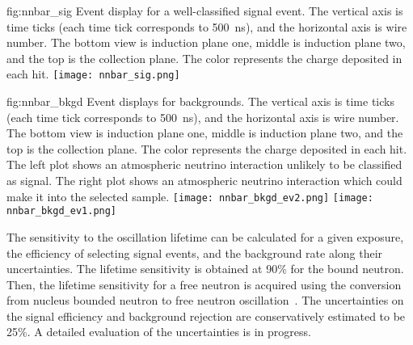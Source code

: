 \begin{dunefigure}
{fig:nnbar_sig}
{Event display for a well-classified \nnbar signal event.  The vertical axis is time ticks (each time tick corresponds to \SI{500}{\ns}), and the horizontal axis is wire number.  The bottom view is induction plane one, middle is induction plane two, and the top is the collection plane.  The color represents the charge deposited in each hit.}
\texttt{[image: nnbar\_sig.png]}
\end{dunefigure} 

\begin{dunefigure}
{fig:nnbar_bkgd}
{Event displays for \nnbar backgrounds.  The vertical axis is time ticks (each time tick corresponds to \SI{500}{\ns}), and the horizontal axis is wire number.  The bottom view is induction plane one, middle is induction plane two, and the top is the collection plane.  The color represents the charge deposited in each hit.  The left plot shows an atmospheric neutrino interaction unlikely to be classified as signal. The right plot shows an atmospheric neutrino interaction which could make it into the selected sample.}
\texttt{[image: nnbar\_bkgd\_ev2.png]}
\texttt{[image: nnbar\_bkgd\_ev1.png]}
\end{dunefigure} 

The sensitivity to the \nnbar oscillation lifetime can be calculated for a given exposure, the efficiency of selecting signal events, and the background rate along their uncertainties. The lifetime sensitivity is obtained at \num{90}\%  for the bound neutron. Then, the lifetime sensitivity for a free neutron is acquired using the conversion from nucleus bounded neutron to free neutron \nnbar oscillation~\cite{Friedman:2008es}.  
The uncertainties on the signal efficiency and background rejection are conservatively estimated to be \num{25}\%.  A detailed evaluation of the uncertainties is in progress.

